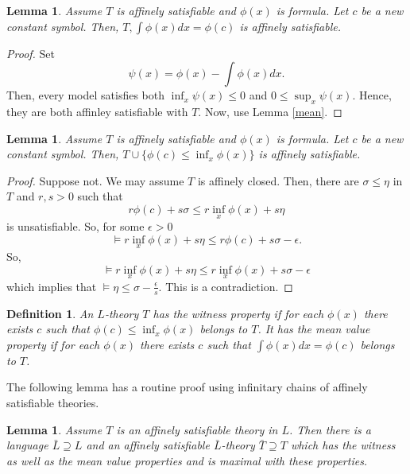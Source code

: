 \documentclass[12pt]{article}
\newtheorem{lemma}[theorem]{Lemma}
\newtheorem{definition}[theorem]{Definition}
\begin{document}
\begin{lemma}
Assume $T$ is affinely satisfiable and $\phi(x)$ is formula. Let $c$ be a new constant symbol.
Then, $T,\int\phi(x)dx=\phi(c)$ is affinely satisfiable.
\end{lemma}
\begin{proof}
Set $$\psi(x)=\phi(x)-\int\phi(x)dx.$$
Then, every model satisfies both $\inf_x\psi(x)\leqslant0$ and $0\leqslant\sup_x\psi(x)$.
Hence, they are both affinley satisfiable with $T$. Now, use Lemma \ref{mean}.
\end{proof}

\begin{lemma}
Assume $T$ is affinely satisfiable and $\phi(x)$ is formula. Let $c$ be a new constant symbol.
Then, $T\cup\{\phi(c)\leqslant\inf_x\phi(x)\}$ is affinely satisfiable.
\end{lemma}
\begin{proof}
Suppose not. We may assume $T$ is affinely closed. Then, there are $\sigma\leqslant\eta$ in $T$ and $r,s>0$ such that
$$r\phi(c)+s\sigma\leqslant r\inf_x\phi(x)+s\eta$$ is unsatisfiable. So, for some $\epsilon>0$
$$\vDash r\inf_x\phi(x)+s\eta\leqslant r\phi(c)+s\sigma-\epsilon.$$
So, $$\vDash r\inf_x\phi(x)+s\eta\leqslant r\inf_x\phi(x)+s\sigma-\epsilon$$
which implies that $\vDash \eta\leqslant\sigma-\frac{\epsilon}{s}$. This is a contradiction.
\end{proof}

\begin{definition}\label{witness-mean}
\em{An $L$-theory $T$ has \emph{the witness property} if for each $\phi(x)$ there exists $c$ such that
$\phi(c)\leqslant\inf_x\phi(x)$ belongs to $T$. It has the \emph{mean value property} if for each $\phi(x)$
there exists $c$ such that $\int\phi(x)dx=\phi(c)$ belongs to $T$.}
\end{definition}

The following lemma has a routine proof using infinitary chains of affinely satisfiable theories.

\begin{lemma}
Assume $T$ is an affinely satisfiable theory in $L$. Then there is a language $\bar{L}\supseteq L$
and an affinely satisfiable $\bar{L}$-theory $\bar{T}\supseteq T$ which has the witness as well as
the mean value properties and is maximal with these properties.
\end{lemma}
\end{document}
